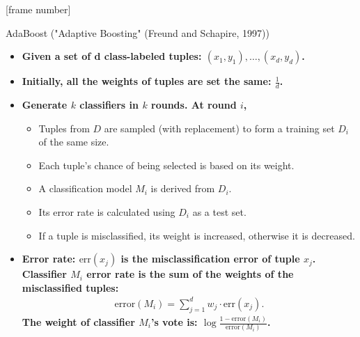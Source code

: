 \documentclass[aspectratio=169,t,table]{beamer}
\begin{document}
  {
    [frame number]
    \begin{frame}{AdaBoost ("Adaptive Boosting" (Freund and Schapire, 1997))}
      \begin{itemize}
        \item \textbf{Given a set of d class-labeled tuples: $(x_1 , y_1), \ldots, (x_d, y_d)$.}
        \item \textbf{Initially, all the weights of tuples are set the same: $\frac{1}{d}$.}
        \item \textbf{Generate $k$ classifiers in $k$ rounds. At round $i$,}
        \begin{itemize}
          \item Tuples from $D$ are sampled (with replacement) to form a training set $D_i$ of the same size.
          \item Each tuple's chance of being selected is based on its weight.
          \item A classification model $M_i$ is derived from $D_i$.
          \item Its error rate is calculated using $D_i$ as a test set.
          \item If a tuple is misclassified, its weight is increased, otherwise it is decreased.
        \end{itemize}
        \item \textbf{Error rate: $\text{err}(x_j)$ is the misclassification error of tuple $x_j$. Classifier $M_i$ error rate is the sum of the weights of the misclassified tuples:}
        \begin{align}
          \text{error}(M_i) = \sum_{j=1}^{d} w_j \cdot \text{err}(x_j).
        \end{align}
        \textbf{The weight of classifier $M_i$'s vote is: $\log \frac{1-\text{error}(M_i)}{\text{error}(M_i)}$.}
      \end{itemize}
    \end{frame}
  }
\end{document}
